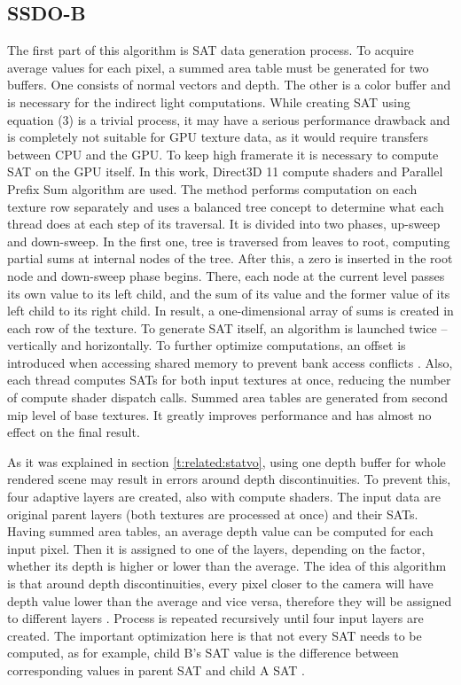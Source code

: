 \documentclass[10pt,journal,compsoc,twoside]{IEEEtran}
\begin{document}
	\subsection{SSDO-B}\label{t:solutions:b}
	
	
	The first part of this algorithm is SAT data generation process. To acquire average values for each pixel, a summed area table must be generated for two buffers. One consists of normal vectors and depth. The other is a color buffer and is necessary for the indirect light computations. While creating SAT using equation (3) is a trivial process, it may have a serious performance drawback and is completely not suitable for GPU texture data, as it would require transfers between CPU and the GPU. To keep high framerate it is necessary to compute SAT on the GPU itself. In this work, Direct3D 11 compute shaders and Parallel Prefix Sum algorithm \cite{prefix-sum} are used. The method performs computation on each texture row separately and uses a balanced tree concept to determine what each thread does at each step of its traversal. It is divided into two phases, up-sweep and down-sweep. In the first one, tree is traversed from leaves to root, computing partial sums at internal nodes of the tree. After this, a zero is inserted in the root node and down-sweep phase begins. There, each node at the current level passes its own value to its left child, and the sum of its value and the former value of its left child to its right child. In result, a one-dimensional array of sums is created in each row of the texture. To generate SAT itself, an algorithm is launched twice -- vertically and horizontally. To further optimize computations, an offset is introduced when accessing shared memory to prevent bank access conflicts \cite{directcompute}. Also, each thread computes SATs for both input textures at once, reducing the number of compute shader dispatch calls. Summed area tables are generated from second mip level of base textures. It greatly improves performance and has almost no effect on the final result.
	
	As it was explained in section \ref{t:related:statvo}, using one depth buffer for whole rendered scene may result in errors around depth discontinuities. To prevent this, four adaptive layers are created, also with compute shaders. The input data are original parent layers (both textures are processed at once) and their SATs. Having summed area tables, an average depth value can be computed for each input pixel. Then it is assigned to one of the layers, depending on the factor, whether its depth is higher or lower than the average. The idea of this algorithm is that around depth discontinuities, every pixel closer to the camera will have depth value lower than the average and vice versa, therefore they will be assigned to different layers \cite{statvo}. Process is repeated recursively until four input layers are created. The important optimization here is that not every SAT needs to be computed, as for example, child B's SAT value is the difference between corresponding values in parent SAT and child A SAT \cite{statvo}.
	
\end{document}
